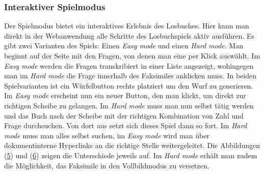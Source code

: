 \documentclass[12pt,a4paper]{article}
\begin{document}
		\subsubsection{Interaktiver Spielmodus}
		Der Spielmodus bietet ein interaktives Erlebnis des Losbuches. Hier kann man direkt in der Webanwendung alle Schritte des Losbuchspiels aktiv ausführen.
		Es gibt zwei Varianten des Spiels: Einen \textit{Easy mode} und einen \textit{Hard mode}. Man beginnt auf der Seite mit den Fragen, von denen man eine per Klick 
		auswählt. Im \textit{Easy mode} werden die Fragen transkribiert in einer Liste angezeigt, wohingegen man im \textit{Hard mode} die Frage innerhalb des Faksimiles 
		anklicken muss. In beiden Spielvarianten ist ein Würfelbutton rechts platziert um den Wurf zu generieren. Im \textit{Easy mode} erscheint nun ein neuer Button, den man 
		klickt, um direkt zur richtigen Scheibe zu gelangen. Im \textit{Hard mode} muss man nun selbst tätig werden und das Buch nach der Scheibe mit der richtigen Kombination
		von Zahl und Frage durchsuchen. Von dort aus setzt sich dieses Spiel dann so fort. Im \textit{Hard mode} muss man alles selbst suchen, im \textit{Easy mode} wird man über dokumentinterne Hyperlinks an die
		richtige Stelle weitergeleitet. Die Abbildungen (\hyperref[Abbildung5]{5}) und (\hyperref[Abbildung6]{6}) zeigen die Unterschiede jeweils auf. Im \textit{Hard mode} erhält man zudem die Möglichkeit, das Faksimile in den Vollbildmodus zu versetzen.
		
\end{document}
